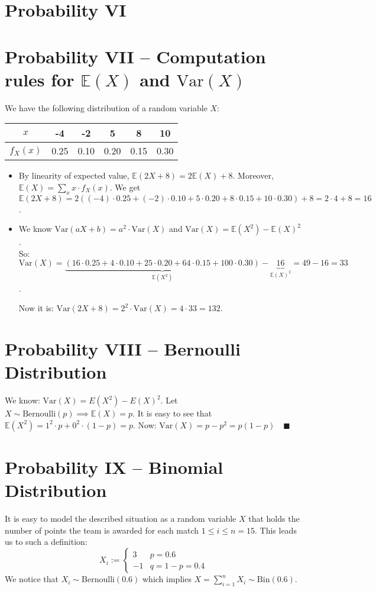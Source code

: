 \documentclass{article}
\begin{document}
\section{Probability VI}

\section{Probability VII -- Computation rules for $\mathbb E(X)$ and $\mathrm{Var}(X)$}
We have the following distribution of a random variable $X$: 
\begin{table}[H]
    \centering
    \begin{tabular}{c|ccccc}
         $x$ & -4 & -2 & 5 & 8 & 10 \\
         \hline
         $f_X(x)$ & 0.25 & 0.10 & 0.20 & 0.15 & 0.30
    \end{tabular}
\end{table}
\begin{itemize}
    \item By linearity of expected value, $\mathbb E(2X+8) = 2\mathbb E(X) + 8$. Moreover, $\mathbb E(X) = \displaystyle \sum_{x} x \cdot f_X(x)$. We get $\mathbb E(2X+8) = 2((-4) \cdot 0.25 + (-2)\cdot 0.10 + 5 \cdot 0.20 + 8 \cdot 0.15 + 10 \cdot 0.30) + 8 = 2 \cdot 4 + 8 = 16$.
    \item We know $\mathrm{Var}(aX + b) = a^2 \cdot \mathrm{Var}(X)$ and $\mathrm{Var}(X) = \mathbb E(X^2) - \mathbb E(X)^2$. \\ So: $\mathrm{Var}(X) = \underbrace{(16 \cdot 0.25 + 4 \cdot 0.10 + 25 \cdot 0.20 + 64 \cdot 0.15 + 100 \cdot 0.30)}_{\mathbb E(X^2)} - \underbrace{16}_{\mathbb E(X)^2}= 49 - 16 = 33$.
    
    Now it is: $\mathrm{Var}(2X+8) = 2^2 \cdot \mathrm{Var}(X) = 4 \cdot 33 = 132$.
\end{itemize}

\section{Probability VIII -- Bernoulli Distribution}
We know: $\mathrm{Var}(X) = E(X^2) - E(X)^2$. Let $X \sim \mathrm{Bernoulli}(p) \implies \mathbb E(X) = p$.
It is easy to see that $\mathbb E(X^2) = 1^2 \cdot p + 0^2 \cdot (1-p) = p$. Now: $\mathrm{Var}(X) = p - p^2 = p(1-p) \quad \blacksquare$
\section{Probability IX -- Binomial Distribution}
It is easy to model the described situation as a random variable $X$ that holds the number of points the team is awarded for each match $1 \leq i \leq n = 15$. This leads us to such a definition: \[X_i := \left\{
\begin{array}{cl}
    3  & p = 0.6  \\
    -1 & q = 1-p = 0.4 
\end{array}
\right.\]
We notice that $X_i \sim \mathrm{Bernoulli}(0.6)$ which implies $X = \displaystyle \sum_{i=1}^n X_i \sim \mathrm{Bin}(0.6)$.
\end{document}
